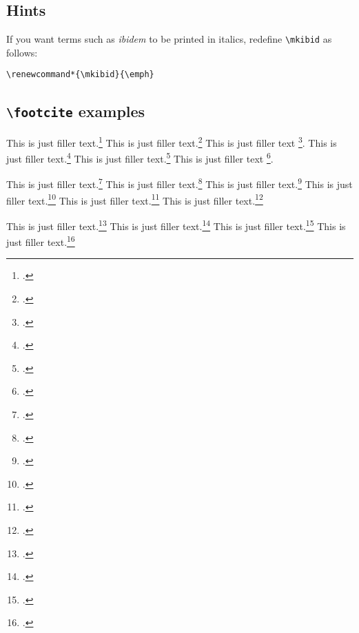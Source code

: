 \documentclass[a4paper]{article}
\newcommand{\cmd}[1]{\texttt{\textbackslash #1}}
\begin{document}
\subsection*{Hints}

If you want terms such as \emph{ibidem} to be printed in italics,
redefine \cmd{mkibid} as follows:

\begin{verbatim}
\renewcommand*{\mkibid}{\emph}
\end{verbatim}

\clearpage

\subsection*{\cmd{footcite} examples}

This is just filler text.\footcite{aristotle:anima}
This is just filler text.\footcite{aristotle:physics}
This is just filler text \footcite{averroes/bland}.
This is just filler text.\footcite{aristotle:anima}
This is just filler text.\footcite{aristotle:physics}
This is just filler text \footcite{averroes/bland}.

\clearpage

This is just filler text.\footcite{aristotle:anima}
This is just filler text.\footcite{aristotle:anima}
This is just filler text.\footcite{aristotle:physics}
This is just filler text.\footcite{aristotle:physics}
\clearpage
This is just filler text.\footcite{aristotle:physics}
This is just filler text.\footcite{aristotle:physics}

\clearpage

This is just filler text.\footcite{kant:kpv}
This is just filler text.\footcite{kant:ku}
This is just filler text.\footcite[24]{kant:kpv}
This is just filler text.\footcite[59--63]{kant:ku}

\clearpage
\end{document}
